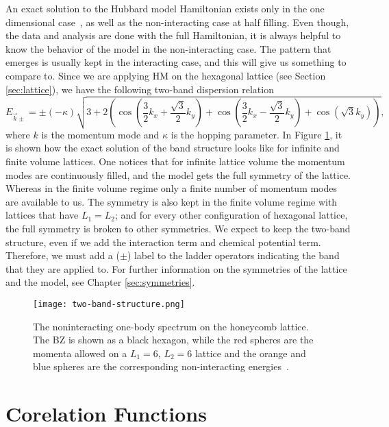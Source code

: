 An exact solution to the Hubbard model Hamiltonian exists only in the one dimensional case~\cite{hubexact}, as well as the non-interacting case at half filling. Even though, the data and analysis are done with the full Hamiltonian, it is always helpful to know the behavior of the model in the non-interacting case. The pattern that emerges is usually kept in the interacting case, and this will give us something to compare to. Since we are applying HM on the hexagonal lattice (see Section \ref{sec:lattice}), we have the following two-band dispersion relation
\begin{equation}
    E_{\vec{k}\pm} = \pm (-\kappa) \sqrt{3 + 2 \left( \cos\left( \frac{3}{2}k_x + \frac{\sqrt{3}}{2}k_y \right) + \cos\left( \frac{3}{2}k_x - \frac{\sqrt{3}}{2}k_y \right) + \cos\left( \sqrt{3}k_y \right) \right)},
\end{equation}
where $k$ is the momentum mode and $\kappa$ is the hopping parameter. In Figure \ref{fig:two-band}, it is shown how the exact solution of the band structure looks like for infinite and finite volume lattices. One notices that for infinite lattice volume the momentum modes are continuously filled, and the model gets the full symmetry of the lattice. Whereas in the finite volume regime only a finite number of momentum modes are available to us. The symmetry is also kept in the finite volume regime with lattices that have $L_1 = L_2$; and for every other configuration of hexagonal lattice, the full symmetry is broken to other symmetries. We expect to keep the two-band structure, even if we add the interaction term and chemical potential term. Therefore, we must add a ($\pm$) label to the ladder operators indicating the band that they are applied to. For further information on the symmetries of the lattice and the model, see Chapter \ref{sec:symmetries}.
\begin{figure}[htbp]
    \centerline{\texttt{[image: two-band-structure.png]}}
    \caption{The noninteracting one-body spectrum on the honeycomb lattice. The BZ is shown as a black hexagon, while the red spheres are the momenta allowed on a $L_1 = 6$, $L_2 = 6$ lattice and the orange and blue spheres are the corresponding non-interacting energies~\cite{evan}.}
    \label{fig:two-band}
\end{figure}


\section{Corelation Functions}
\label{sec:corr_func}

